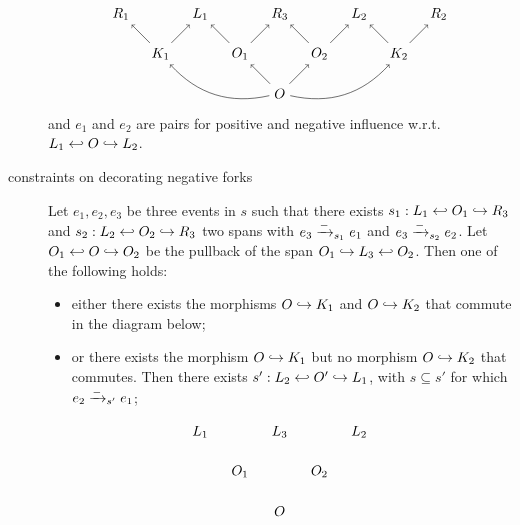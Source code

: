 \begin{definition}
\begin{description}
\begin{itemize}
    \end{itemize}
   \[
    \begin{tikzpicture} %
      \node (o) at (0,-1) {\(O\)};
      \node (r3) at (0,1) {\(R_3\)};
      \node (o1) at (-1,0) {\(O_1\)};
      \node (o2) at (1,0) {\(O_2\)};
      \node (r1) at (-2,1) {\(L_1\)};
      \node (r2) at (2,1) {\(L_2\)};
      \node (l1) at (-4,1) {\(R_1\)};
      \node (l2) at (4,1) {\(R_2\)};
      \node (k1) at (-3,0) {\(K_1\)};
      \node (k2) at (3,0) {\(K_2\)};
      \draw [->] (o) -- (o1);
      \draw [->] (o) -- (o2);
      \draw [->] (o1) -- (r3);
      \draw [->] (o2) -- (r3);
      \draw [->] (o1) -- (r1);
      \draw [->] (o2) -- (r2);
      \draw [->] (k1) -- (r1);
      \draw [->] (k2) -- (r2);
      \draw [->] (k1) -- (l1);
      \draw [->] (k2) -- (l2);
      \draw [->] (o) to [bend left] (k1);
      \draw [->] (o) to [bend right] (k2);
    \end{tikzpicture}
    \]
    and $e_1$ and $e_2$ are pairs for positive and negative influence w.r.t. $L_1\hookleftarrow O\hookrightarrow L_2$.
  \item[constraints on decorating negative forks]
    Let $e_1,e_2,e_3$ be three events in $s$ such that there exists $s_1:L_1\hookleftarrow O_1\hookrightarrow R_3$ and $s_2:L_2\hookleftarrow O_2\hookrightarrow R_3$ two spans with $e_3\mathrel{\xrightarrow{-}}_{s_1} e_1$ and $e_3\mathrel{\xrightarrow{-}}_{s_2} e_2$.
    Let $O_1\hookleftarrow O\hookrightarrow O_2$ be the pullback of the span $O_1\hookrightarrow L_3 \hookleftarrow O_2$. Then one of the following holds:
    \begin{itemize}
    \item either there exists the morphisms $O\hookrightarrow K_1$ and $O\hookrightarrow K_2$ that commute in the diagram below;
    \item or there exists the morphism $O\hookrightarrow K_1$ but no morphism $O\hookrightarrow K_2$ that commutes. Then there exists $s':L_2\hookleftarrow O'\hookrightarrow L_1$, with $s\subseteq s'$ for which $e_2\mathrel{\xrightarrow{-}}_{s'} e_1$;
    \end{itemize}
   \[
    \begin{tikzpicture} %
      \node (o) at (0,-1) {\(O\)};
      \node (r3) at (0,1) {\(L_3\)};
      \node (o1) at (-1,0) {\(O_1\)};
      \node (o2) at (1,0) {\(O_2\)};
      \node (r1) at (-2,1) {\(L_1\)};
      \node (r2) at (2,1) {\(L_2\)};

\end{tikzpicture}\]
\end{description}
\end{definition}
